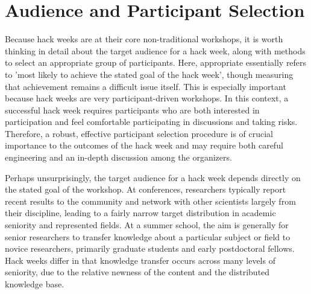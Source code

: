\section*{Audience and Participant Selection}

Because hack weeks are at their core non-traditional workshops, it is worth thinking in detail about the target audience for a hack week, along with methods to select an appropriate group of participants. Here, appropriate essentially refers to 'most likely to achieve the stated goal of the hack week', though measuring that achievement remains a difficult issue itself.
This is especially important because hack weeks are very participant-driven workshops.
In this context, a successful hack week requires participants who are both interested in participation and feel comfortable participating in discussions and taking risks.
Therefore, a robust, effective participant selection procedure is of crucial importance to the outcomes of the hack week and may require both careful engineering and an in-depth discussion among the organizers.

Perhaps unsurprisingly, the target audience for a hack week depends directly on the stated goal of the workshop.
At conferences, researchers typically report recent results to the community and network with other scientists largely from their discipline, leading to a fairly narrow target distribution in academic seniority and represented fields.
At a summer school, the aim is generally for senior researchers to transfer knowledge about a particular subject or field to novice researchers, primarily graduate students and early postdoctoral fellows.
Hack weeks differ in that knowledge transfer occurs across many levels of seniority, due to the relative newness of the content and the distributed knowledge base.


